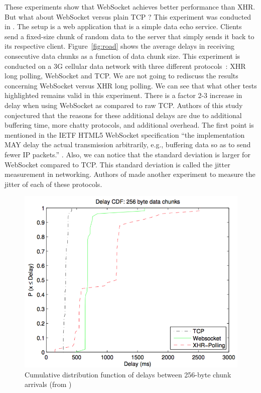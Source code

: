 \documentclass[10pt,journal,compsoc]{IEEEtran}
\newcommand{\ws}{WebSocket}
\begin{document}
These experiments show that \ws{} achieves better performance than XHR.
But what about \ws{} versus plain TCP ? 
This experiment was conducted in \cite{roadblock}.
The setup is a web application that is a simple data echo service.
Clients send a fixed-size chunk of random data to the server that simply sends it back to its respective client.
Figure~\ref{fig:road} shows the average delays in receiving consecutive data chunks as a function of data chunk size. 
This experiment is conducted on a 3G cellular data network with three different \mbox{protocols :} XHR long polling, \ws{} and TCP.
We are not going to rediscuss the results concerning \ws{} versus XHR long polling.
We can see that what other tests highlighted remains valid in this experiment.
There is a factor 2-3 increase in delay when using \ws{} as compared to raw TCP.
Authors of this study conjectured that the reasons for these additional delays are due to additional buffering time, more chatty protocols, and additional overhead.
The first point is mentioned in the IETF HTML5 \ws{} specification ``the implementation MAY delay the actual transmission arbitrarily, e.g., buffering data so as to send fewer IP packets.'' \cite{rfc6455}.
Also, we can notice that the standard deviation is larger for \ws{} compared to TCP.
This standard deviation is called the jitter measurement in networking.
Authors of \cite{roadblock} made another experiment to measure the jitter of each of these protocols.
\begin{figure}[!ht]
    \centering
    \includegraphics[width=\linewidth]{road_jitter.png}
    \caption{Cumulative distribution function of delays between 256-byte chunk arrivals (from \cite{roadblock})}
    \label{fig:road2}
\end{figure}
\end{document}
